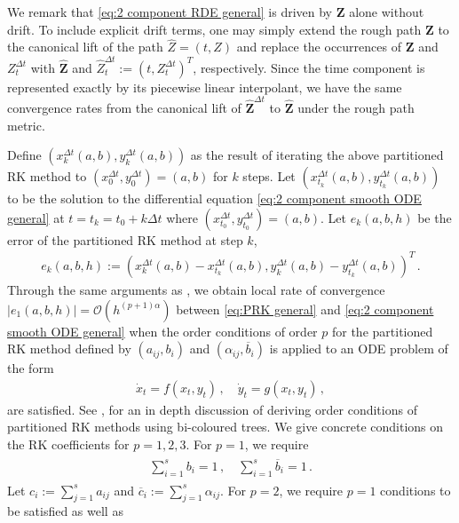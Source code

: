 \documentclass[11pt, oneside]{article}
\numberwithin{equation}{section}
\theoremstyle{definition}
\newcommand{\ob}[1]{\overline{#1}}
\newcommand{\wh}[1]{\widehat{#1}}
\newcommand{\mc}[1]{\mathcal{#1}}
\newcommand{\mcal}[1]{\mc{#1}}
\begin{document}
We remark that \eqref{eq:2 component RDE general} is driven by $\mathbf{Z}$ alone without drift. To include explicit drift terms, one may simply extend the rough path $\mathbf{Z}$ to the canonical lift of the path $\wh{Z} = (t, Z)$ and replace the occurrences of $\mathbf{Z}$ and $Z^{\Delta t}_t$ with $\mathbf{\wh{Z}}$ and $\wh{Z}^{\Delta t}_t := (t, Z^{\Delta t}_t)^T$, respectively. Since the time component is represented exactly by its piecewise linear interpolant, we have the same convergence rates from the canonical lift of $\mathbf{\wh{Z}}^{\Delta t}$ to $\mathbf{\wh{Z}}$ under the rough path metric. 

Define $(x^{\Delta t}_k(a, b), y^{\Delta t}_k(a, b))$ as the result of iterating the above partitioned RK method to $(x^{\Delta t}_0, y^{\Delta t}_0) = (a, b)$ for $k$ steps. Let $(x^{\Delta t}_{t_k}(a,b), y^{\Delta t}_{t_k}(a,b))$ to be the solution to the differential equation \eqref{eq:2 component smooth ODE general} at $t = t_k = t_0 + k \Delta t$ where $(x^{\Delta t}_{t_0}, y^{\Delta t}_{t_0}) = (a, b)$. Let $e_k(a, b, h)$ be the error of the partitioned RK method at step $k$,
\begin{align*}
    e_k(a, b, h) := (x^{\Delta t}_k(a, b) - x^{\Delta t}_{t_k}(a, b), y^{\Delta t}_k(a, b) - y^{\Delta t}_{t_k}(a, b))^T\,.
\end{align*}
Through the same arguments as \cite[Thm 3.3]{RR2020}, we obtain local rate of convergence $|e_1(a, b, h)| = \mcal{O}(h^{(p+1)\alpha})$ between \eqref{eq:PRK general} and \eqref{eq:2 component smooth ODE general} when the order conditions of order $p$ for the partitioned RK method defined by $(a_{ij}, b_i)$ and $(\alpha_{ij}, \ob{b}_i)$ is applied to an ODE problem of the form 
\begin{align*}
    \dot{x}_t = f(x_t, y_t)\,,\quad \dot{y}_t = g(x_t, y_t)\,,
\end{align*}
are satisfied. See \cite[Chapter 3]{Hairer2006}, \cite[Chapter 7]{sanz2018numerical} for an in depth discussion of deriving order conditions of partitioned RK methods using bi-coloured trees. We give concrete conditions on the RK coefficients for $p = 1,2,3$. For $p=1$, we require
\begin{align}
    \begin{split}
        \sum_{i=1}^s b_i = 1 \,,\quad \sum_{i=1}^s \ob{b}_i = 1\,.
    \end{split}
\end{align}
Let $c_i := \sum_{j=1}^s a_{ij}$ and $\ob{c}_i := \sum_{j=1}^s \alpha_{ij}$. For $p=2$, we require $p=1$ conditions to be satisfied as well as
\end{document}
